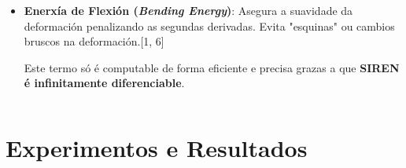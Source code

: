\documentclass[xcolor=dvipsnames]{beamer}
\begin{document}
\begin{frame}
\begin{columns}
\begin{column}{0.5\textwidth}
\begin{itemize}
                \item \textbf{Enerxía de Flexión (\textit{Bending Energy})}: Asegura a suavidade da deformación penalizando as segundas derivadas. Evita "esquinas" ou cambios bruscos na deformación.[1, 6]
                
                \vspace{0.2cm}
                \begin{alertblock}{}
                    Este termo só é computable de forma eficiente e precisa grazas a que \textbf{SIREN é infinitamente diferenciable}.
                \end{alertblock}
            \end{itemize}
        \end{column}
    \end{columns}
    
\end{frame}


\section{Experimentos e Resultados}
\end{document}

